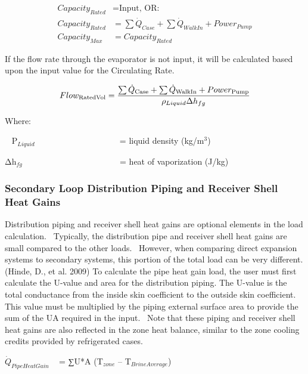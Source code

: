 \begin{equation}
  \begin{array}{rl}
    Capacity_{Rated} &= \text{Input,  OR:} \\
    Capacity_{Rated} &= \sum \dot{Q}_{Case} + \sum \dot{Q}_{WalkIn} + Power_{Pump} \\
    Capacity_{Max}   &= Capacity_{Rated}
  \end{array}
\end{equation}

If the flow rate through the evaporator is not input, it will be calculated based upon the input value for the Circulating Rate.

\begin{equation}
Flo{w_{{\rm{RatedVol}}}} = \frac{{\sum {{{\dot Q}_{{\rm{Case}}}} + \sum {{{\dot Q}_{{\rm{WalkIn}}}} + Powe{r_{{\rm{Pump}}}}} } }}{{{\rho_{Liquid}}\Delta {h_{fg}}}}
\end{equation}

Where:

~ Ρ\(_{Liquid}\)~ ~~~~~~~~~~~~~~~~~~ = liquid density (kg/m\(^{3}\))

Δh\(_{fg}\) ~~~~~~~~~~~~~~~~~~~~~~ = heat of vaporization (J/kg)

\subsubsection{Secondary Loop Distribution Piping and Receiver Shell Heat Gains}\label{secondary-loop-distribution-piping-and-receiver-shell-heat-gains}

Distribution piping and receiver shell heat gains are optional elements in the load calculation.~ Typically, the distribution pipe and receiver shell heat gains are small compared to the other loads.~ However, when comparing direct expansion systems to secondary systems, this portion of the total load can be very different. (Hinde, D., et al. 2009) To calculate the pipe heat gain load, the user must first calculate the U-value and area for the distribution piping. The U-value is the total conductance from the inside skin coefficient to the outside skin coefficient. This value must be multiplied by the piping external surface area to provide the sum of the UA required in the input.~ Note that these piping and receiver shell heat gains are also reflected in the zone heat balance, similar to the zone cooling credits provided by refrigerated cases.

\({\dot Q_{PipeHeatGain}}\) ~ = ∑U*A (T\(_{zone}\) -- T\(_{BrineAverage}\))

